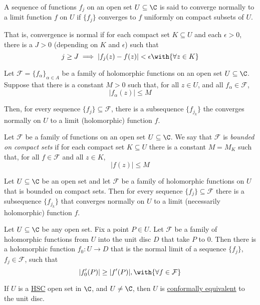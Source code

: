 \Definition{}\label{fe96ff9}

A sequence of functions $f_j$ on an open set $U\subseteq\C$ is said to converge
normally to a limit function $f$ on $U$ if $\{f_j\}$ converges to $f$ uniformly
on compact subsets of $U$.

That is, convergence is normal if for each compact set $K\subseteq U$ and each
$\epsilon>0$, there is a $J>0$ (depending on $K$ and $\epsilon$) such that
$$
  j\geq J\implies|f_j(z)-f(z)|<\epsilon\with{\forall z\in K}
$$

\label{b4a14fe}

Let $\mathcal F=\{f_\alpha\}_{\alpha\in A}$ be a family of holomorphic
functions on an open set $U\subseteq\C$. Suppose that there is a constant $M>0$
such that, for all $z\in U$, and all $f_\alpha\in\mathcal F$,
$$
  |f_\alpha(z)|\leq M
$$

Then, for every sequence $\{f_j\}\subseteq\mathcal F$, there is a subsequence
$\{f_{j_k}\}$ the converges normally on $U$ to a limit (holomorphic) function
$f$.

\Definition{}\label{f152035}

Let $\mathcal F$ be a family of functions on an open set $U\subseteq\C$. We say
that $\mathcal F$ is \textit{bounded on compact sets} if for each compact set
$K\subseteq U$ there is a constant $M=M_K$ such that, for all $f\in\mathcal F$
and all $z\in K$,
$$
  |f(z)|\leq M
$$

\label{ad5126c}

Let $U\subseteq\C$ be an open set and let $\mathcal F$ be a family of
holomorphic functions on $U$ that is bounded on compact sets. Then for every
sequence $\{f_j\}\subseteq\mathcal F$ there is a subsequence $\{f_{j_k}\}$ that
converges normally on $U$ to a limit (necessarily holomorphic) function $f$.

\Proposition{}\label{e7d014b}

Let $U\subseteq\C$ be any open set. Fix a point $P\in U$. Let $\mathcal F$ be a
family of holomorphic functions from $U$ into the unit disc $D$ that take $P$
to $0$. Then there is a holomorphic function $f_0:U\to D$ that is the normal
limit of a sequence $\{f_j\}$, $f_j\in\mathcal F$, such that
$$
  |f_0'(P)|\geq|f'(P)|,\with{\forall f\in\mathcal F}
$$

\label{bd0fcb9}

If $U$ is a \href{d20898f}{HSC} open set in $\C$, and $U\neq\C$, then $U$ is
\href{ee69976}{conformally equivalent} to the unit disc.

